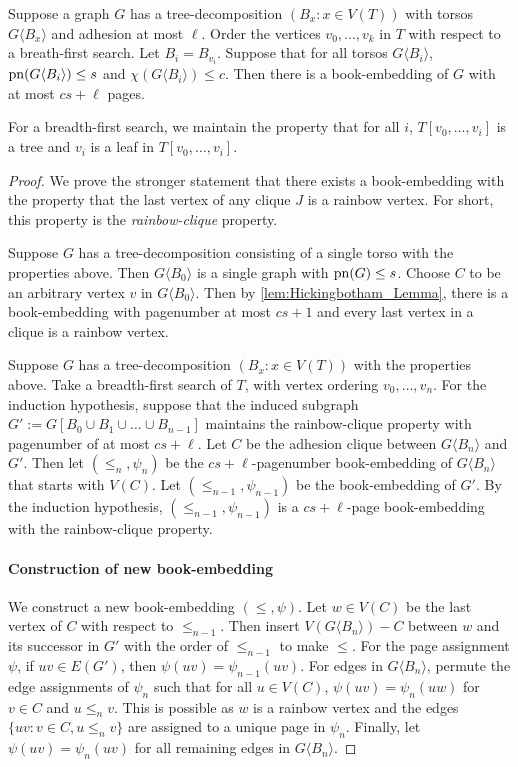 \begin{theorem}
	Suppose a graph \(G\) has a tree-decomposition \((B_x: x \in V(T))\) with torsos \(G \langle B_x \rangle\) and adhesion at most \(\ell\). Order the vertices \(v_0, \ldots, v_k\) in $T$ with respect to a breath-first search. Let $B_i = B_{v_i}$. Suppose that for all torsos $G\langle B_i \rangle$, \(\operatorname{pn}(G\langle B_i \rangle) \leq s\) and \(\chi(G\langle B_i \rangle) \leq c\). Then there is a book-embedding of \(G\) with at most \(cs + \ell\) pages.
\end{theorem}
For a breadth-first search, we maintain the property that for all \(i\), \(T[v_0, \ldots, v_{i}]\) is a tree and \(v_i\) is a leaf in \(T[v_0, \ldots, v_{i}]\).
\begin{proof}
	We prove the stronger statement that there exists a book-embedding with the property that the last vertex of any clique \(J\) is a rainbow vertex. For short, this property is the \textit{rainbow-clique} property. 

	Suppose $G$ has a tree-decomposition consisting of a single torso with the properties above. Then \(G\langle B_0 \rangle\) is a single graph with \(\operatorname{pn}(G) \leq s\). Choose \(C\) to be an arbitrary vertex \(v\) in \(G\langle B_0 \rangle\). Then by \cref{lem:Hickingbotham_Lemma}, there is a book-embedding with pagenumber at most \(cs + 1\) and every last vertex in a clique is a rainbow vertex.

	Suppose $G$ has a tree-decomposition $(B_x: x \in V(T))$ with the properties above. Take a breadth-first search of $T$, with vertex ordering $v_0, \ldots, v_n$. For the induction hypothesis, suppose that the induced subgraph $G' := G[B_0 \cup B_1 \cup \ldots \cup B_{n-1}]$ maintains the rainbow-clique property with pagenumber of at most \(cs + \ell\).  
	Let \(C\) be the adhesion clique between \(G \langle B_n \rangle\) and $G'$. Then let \((\leq_n, \psi_n)\) be the \(cs + \ell\)-pagenumber book-embedding of \(G \langle B_n \rangle\) that starts with \(V(C)\). Let \((\leq_{n-1}, \psi_{n-1})\) be the book-embedding of \(G'\). By the induction hypothesis, \((\leq_{n-1}, \psi_{n-1})\) is a \(cs + \ell\)-page book-embedding with the rainbow-clique property.

	\paragraph{Construction of new book-embedding}
	We construct a new book-embedding \((\leq, \psi)\).
	Let \(w \in V(C)\) be the last vertex of \(C\) with respect to \(\leq_{n-1}\). Then insert \(V(G \langle B_n \rangle) - C\) between \(w\) and its successor in $G'$ with the order of \(\leq_{n-1}\) to make $\leq$. For the page assignment \(\psi\), if \(uv \in E(G')\), then \(\psi(uv) = \psi_{n-1}(uv)\). For edges in $G \langle B_n \rangle$, permute the edge assignments of \(\psi_n\) such that for all \(u \in V(C)\), \(\psi(uv) = \psi_n(uw)\) for $v \in C$ and $u \leq_n v$. This is possible as \(w\) is a rainbow vertex and the edges \(\{uv : v \in C, u \leq_n v\}\) are assigned to a unique page in \(\psi_n\). Finally, let \(\psi(uv) = \psi_n(uv)\) for all remaining edges in $G \langle B_n \rangle$. 

\end{proof}

